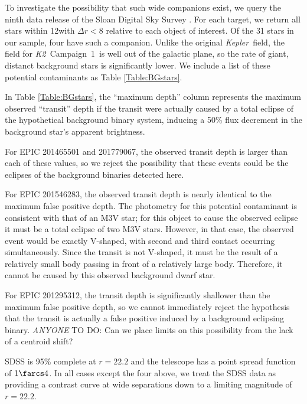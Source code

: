 \documentclass{emulateapj}
\newcommand{\project}[1]{\textsl{#1}}
\newcommand{\kep}{\project{Kepler}}
\newcommand{\KT}{\project{K2}}
\newcommand{\Ci}{Campaign~1}
\newcommand{\todo}[3]{{\color{#2} \emph{#1} TO DO: #3}}
\newcommand{\anytodo}[1]{\todo{ANYONE}{NavyBlue}{#1}}
\begin{document}
To investigate the possibility that such wide companions exist,
we query the ninth data release of the Sloan Digital Sky Survey
\citep[SDSS DR9,][]{Ahn12}.
For each target, we return
all stars within 12\arcsec with $\Delta r < 8$ relative to each object
of interest.
Of the 31 stars in our sample, four have such a companion.
Unlike the original \kep\ field, the field for \KT\ \Ci\ is
well out of the galactic plane, so the rate of giant, distanct background
stars is significantly lower.
We include a list of these potential contaminants as Table
\ref{Table:BGstars}.


In Table \ref{Table:BGstars}, the ``maximum depth'' column represents
the maximum observed ``transit'' depth if the transit were actually caused
by a total eclipse of the hypothetical background binary system, inducing
a 50\% flux decrement in the background star's apparent brightness.

For EPIC 201465501 and 201779067, the observed transit depth is
larger than each of these values, so we reject the possibility that
these events could be the eclipses of the background binaries detected
here.

For EPIC 201546283, the observed transit depth is nearly identical to
the maximum false positive depth.
The photometry for this potential contaminant is consistent with that
of an M3V star; for this object to cause the observed eclipse it must
be a total eclipse of two M3V stars.
However, in that case, the observed event would be exactly V-shaped,
with second and third contact occurring simultaneously.
Since the transit is not V-shaped, it must be the result of
a relatively small body passing in front of a relatively large body.
Therefore, it cannot be caused by this observed background dwarf star.

For EPIC 201295312, the transit depth is significantly shallower than
the maximum false positive depth, so we cannot immediately
reject the hypothesis that the transit is actually a false positive
induced by a background eclipsing binary. \anytodo{Can we place limits
on this possibility from the lack of a centroid shift?}

SDSS is 95\% complete at $r=22.2$ and the telescope has a point
spread function of $1\farcs4$. In all cases except the four above, we
treat the SDSS data as providing a contrast curve at wide separations
down to a limiting magnitude of $r=22.2$.
\end{document}
